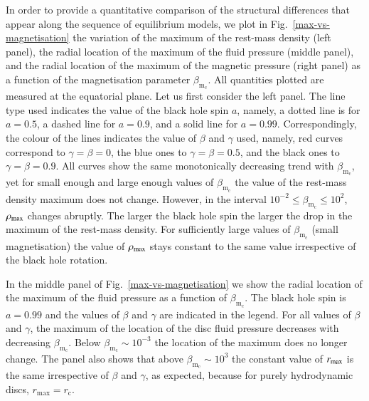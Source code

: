 \documentclass[referee]{aa}
\begin{document}
In order to provide a quantitative comparison of the structural differences that appear along the sequence of equilibrium models, we plot in Fig.~\ref{max-vs-magnetisation} the variation of the maximum of the rest-mass density (left panel), the radial location of the maximum of the fluid pressure (middle panel), and the radial location of the maximum of the magnetic pressure (right panel) as a function of the magnetisation parameter $\beta_{\mathrm{m}_{\mathrm{c}}}$. All quantities plotted are measured at the equatorial plane. Let us first consider the left panel. The line type used indicates the value of the black hole spin $a$, namely, a dotted line is for $a=0.5$, a dashed line for $a=0.9$, and a solid line for $a=0.99$. Correspondingly, the colour of the lines indicates the value of $\beta$ and $\gamma$ used, namely, red curves correspond to $\gamma=\beta=0$, the blue ones to $\gamma=\beta=0.5$, and the black ones to $\gamma=\beta=0.9$. All curves show the same monotonically decreasing trend with $\beta_{\mathrm{m}_{\mathrm{c}}}$, yet for small enough and large enough values of $\beta_{\mathrm{m}_{\mathrm{c}}} $ the value of the rest-mass density maximum does not change. However, in the interval $10^{-2}\le \beta_{\mathrm{m}_{\mathrm{c}}} \le 10^{2}$, $\rho_{\rm max}$ changes abruptly. The larger the black hole spin the larger the drop in the maximum of the rest-mass density. For sufficiently large values of $\beta_{\mathrm{m}_{\mathrm{c}}}$ (small magnetisation) the value of $\rho_{\rm max}$ stays constant to the same value irrespective of the black hole rotation.

In the middle panel of Fig.~\ref{max-vs-magnetisation} we show the radial location of the maximum of the fluid pressure as a function of $\beta_{\mathrm{m}_{\mathrm{c}}}$. The black hole spin is $a=0.99$ and the values of $\beta$ and $\gamma$ are indicated in the legend. For all values of $\beta$ and $\gamma$, the maximum of the location of the disc fluid pressure decreases with decreasing $\beta_{\mathrm{m}_{\mathrm{c}}}$. Below $\beta_{\mathrm{m}_{\mathrm{c}}}\sim 10^{-3}$ the location of the maximum does no longer change. The panel also shows that above $\beta_{\mathrm{m}_{\mathrm{c}}}\sim 10^{3}$ the constant value of $r_{\rm max}$ is the same irrespective of $\beta$ and $\gamma$, as expected, because for purely hydrodynamic discs, $r_{\mathrm{max}} = r_{\mathrm{c}}$.
\end{document}
